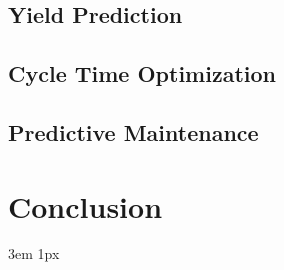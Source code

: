 \documentclass{Academic}
\begin{document}
    \subsection{Yield Prediction}

    \subsection{Cycle Time Optimization}

    \subsection{Predictive Maintenance}

    \section{Conclusion}

    \singlespacing
    \emergencystretch 3em
    \hfuzz 1px
    \printbibliography[heading=bibnumbered]




\end{document}
